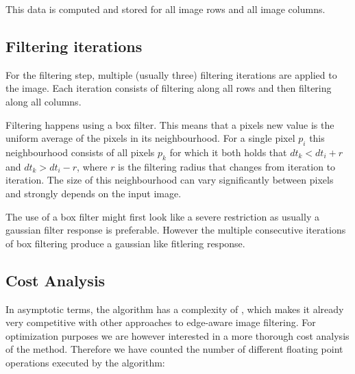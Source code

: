 This data is computed and stored for all image rows and all image columns.

\subsection{Filtering iterations}

For the filtering step, multiple (usually three) filtering iterations are applied to the image. Each iteration consists of filtering along all rows and then filtering along all columns.

Filtering happens using a box filter. This means that a pixels new value is the uniform average of the pixels in its neighbourhood. For a single pixel $p_i$ this neighbourhood consists of all pixels $p_k$ for which it both holds that $dt_k < dt_i+r$ and $dt_k > dt_i-r$, where $r$ is the filtering radius that changes from iteration to iteration. The size of this neighbourhood can vary significantly between pixels and strongly depends on the input image.

The use of a box filter might first look like a severe restriction as usually a gaussian filter response is preferable. However the multiple consecutive iterations of box filtering produce a gaussian like fitlering response.

\subsection{Cost Analysis}
In asymptotic terms, the algorithm has a complexity of , which makes it already very competitive with other approaches to edge-aware image filtering. For optimization purposes we are however interested in a more thorough cost analysis of the method. Therefore we have counted the number of different floating point operations executed by the algorithm:


